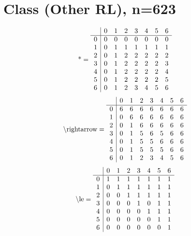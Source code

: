 \documentclass[11pt]{article}
\begin{document}
\section{Class (Other RL), n=623}
\[\text{*} = 
\begin{array}{r | r r r r r r r}
 & 0 & 1 & 2 & 3 & 4 & 5 & 6 \\ \hline
0 & 0 & 0 & 0 & 0 & 0 & 0 & 0 \\
1 & 0 & 1 & 1 & 1 & 1 & 1 & 1 \\
2 & 0 & 1 & 2 & 2 & 2 & 2 & 2 \\
3 & 0 & 1 & 2 & 2 & 2 & 2 & 3 \\
4 & 0 & 1 & 2 & 2 & 2 & 2 & 4 \\
5 & 0 & 1 & 2 & 2 & 2 & 2 & 5 \\
6 & 0 & 1 & 2 & 3 & 4 & 5 & 6 \\
\end{array}
\]
\[\text{\textbackslash rightarrow} = 
\begin{array}{r | r r r r r r r}
 & 0 & 1 & 2 & 3 & 4 & 5 & 6 \\ \hline
0 & 6 & 6 & 6 & 6 & 6 & 6 & 6 \\
1 & 0 & 6 & 6 & 6 & 6 & 6 & 6 \\
2 & 0 & 1 & 6 & 6 & 6 & 6 & 6 \\
3 & 0 & 1 & 5 & 6 & 5 & 6 & 6 \\
4 & 0 & 1 & 5 & 5 & 6 & 6 & 6 \\
5 & 0 & 1 & 5 & 5 & 5 & 6 & 6 \\
6 & 0 & 1 & 2 & 3 & 4 & 5 & 6 \\
\end{array}
\]
\[\text{\textbackslash le} = 
\begin{array}{r | r r r r r r r}
 & 0 & 1 & 2 & 3 & 4 & 5 & 6 \\ \hline
0 & 1 & 1 & 1 & 1 & 1 & 1 & 1 \\
1 & 0 & 1 & 1 & 1 & 1 & 1 & 1 \\
2 & 0 & 0 & 1 & 1 & 1 & 1 & 1 \\
3 & 0 & 0 & 0 & 1 & 0 & 1 & 1 \\
4 & 0 & 0 & 0 & 0 & 1 & 1 & 1 \\
5 & 0 & 0 & 0 & 0 & 0 & 1 & 1 \\
6 & 0 & 0 & 0 & 0 & 0 & 0 & 1 \\
\end{array}
\]
\end{document}
